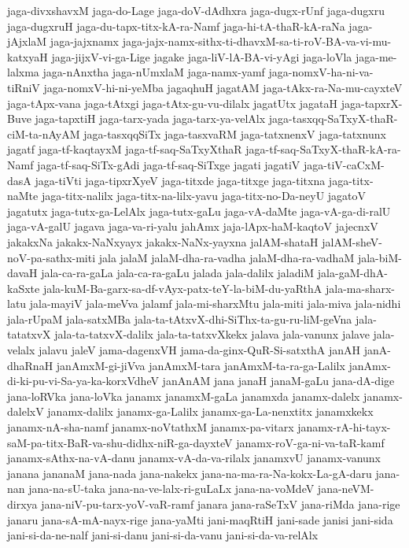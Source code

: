 {jaga-divxshavxM
jaga-do-Lage
jaga-doV-dAdhxra
jaga-dugx-rUnf
jaga-dugxru
jaga-dugxruH
jaga-du-tapx-titx-kA-ra-Namf
jaga-hi-tA-thaR-kA-raNa
jaga-jAjxlaM
jaga-jajxnamx
jaga-jajx-namx-sithx-ti-dhavxM-sa-ti-roV-BA-va-vi-mu-katxyaH
jaga-jijxV-vi-ga-Lige
jagake
jaga-liV-lA-BA-vi-yAgi
jaga-loVla
jaga-me-lalxma
jaga-nAnxtha
jaga-nUmxlaM
jaga-namx-yamf
jaga-nomxV-ha-ni-va-tiRniV
jaga-nomxV-hi-ni-yeMba
jagaqhuH
jagatAM
jaga-tAkx-ra-Na-mu-cayxteV
jaga-tApx-vana
jaga-tAtxgi
jaga-tAtx-gu-vu-dilalx
jagatUtx
jagataH
jaga-tapxrX-Buve
jaga-tapxtiH
jaga-tarx-yada
jaga-tarx-ya-velAlx
jaga-tasxqq-SaTxyX-thaR-ciM-ta-nAyAM
jaga-tasxqqSiTx
jaga-tasxvaRM
jaga-tatxnenxV
jaga-tatxnunx
jagatf
jaga-tf-kaqtayxM
jaga-tf-saq-SaTxyXthaR
jaga-tf-saq-SaTxyX-thaR-kA-ra-Namf
jaga-tf-saq-SiTx-gAdi
jaga-tf-saq-SiTxge
jagati
jagatiV
jaga-tiV-caCxM-dasA
jaga-tiVti
jaga-tipxrXyeV
jaga-titxde
jaga-titxge
jaga-titxna
jaga-titx-naMte
jaga-titx-nalilx
jaga-titx-na-lilx-yavu
jaga-titx-no-Da-neyU
jagatoV
jagatutx
jaga-tutx-ga-LelAlx
jaga-tutx-gaLu
jaga-vA-daMte
jaga-vA-ga-di-ralU
jaga-vA-galU
jagava
jaga-va-ri-yalu
jahAmx
jaja-lApx-haM-kaqtoV
jajecnxV
jakakxNa
jakakx-NaNxyayx
jakakx-NaNx-yayxna
jalAM-shataH
jalAM-sheV-noV-pa-sathx-miti
jala
jalaM
jalaM-dha-ra-vadha
jalaM-dha-ra-vadhaM
jala-biM-davaH
jala-ca-ra-gaLa
jala-ca-ra-gaLu
jalada
jala-dalilx
jaladiM
jala-gaM-dhA-kaSxte
jala-kuM-Ba-garx-sa-df-vAyx-patx-teY-la-biM-du-yaRthA
jala-ma-sharx-latu
jala-mayiV
jala-meVva
jalamf
jala-mi-sharxMtu
jala-miti
jala-miva
jala-nidhi
jala-rUpaM
jala-satxMBa
jala-ta-tAtxvX-dhi-SiThx-ta-gu-ru-liM-geVna
jala-tatatxvX
jala-ta-tatxvX-dalilx
jala-ta-tatxvXkekx
jalava
jala-vanunx
jalave
jala-velalx
jalavu
jaleV
jama-dagenxVH
jama-da-ginx-QuR-Si-satxthA
janAH
janA-dhaRnaH
janAmxM-gi-jiVva
janAmxM-tara
janAmxM-ta-ra-ga-Lalilx
janAmx-di-ki-pu-vi-Sa-ya-ka-korxVdheV
janAnAM
jana
janaH
janaM-gaLu
jana-dA-dige
jana-loRVka
jana-loVka
janamx
janamxM-gaLa
janamxda
janamx-dalelx
janamx-dalelxV
janamx-dalilx
janamx-ga-Lalilx
janamx-ga-La-nenxtitx
janamxkekx
janamx-nA-sha-namf
janamx-noVtathxM
janamx-pa-vitarx
janamx-rA-hi-tayx-saM-pa-titx-BaR-va-shu-didhx-niR-ga-dayxteV
janamx-roV-ga-ni-va-taR-kamf
janamx-sAthx-na-vA-danu
janamx-vA-da-va-rilalx
janamxvU
janamx-vanunx
janana
jananaM
jana-nada
jana-nakekx
jana-na-ma-ra-Na-kokx-La-gA-daru
jana-nan
jana-na-sU-taka
jana-na-ve-lalx-ri-guLaLx
jana-na-voMdeV
jana-neVM-dirxya
jana-niV-pu-tarx-yoV-vaR-ramf
janara
jana-raSeTxV
jana-riMda
jana-rige
janaru
jana-sA-mA-nayx-rige
jana-yaMti
jani-maqRtiH
jani-sade
janisi
jani-sida
jani-si-da-ne-nalf
jani-si-danu
jani-si-da-vanu
jani-si-da-va-relAlx
}
